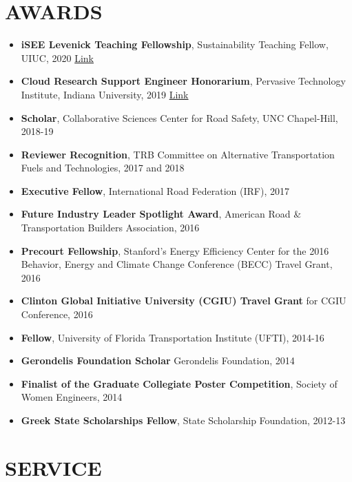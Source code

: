 \documentclass[margin,line]{resume}
\begin{document}
\begin{resume}
	     \section{\mysidestyle \bf AWARDS} 
%
  \vspace{0pt}
    \begin{itemize}
\item \textbf{iSEE Levenick Teaching Fellowship}, Sustainability Teaching Fellow, UIUC, 2020 \href{https://sustainability.illinois.edu/about/partnerships/levenick-isee-fellows-program/}{Link}
\item \textbf{Cloud Research Support Engineer Honorarium}, Pervasive Technology Institute, Indiana University, 2019 \href{https://educationblog.microsoft.com/en-us/2019/02/announcing-a-1m-grant-to-advance-the-role-of-humanware-in-academic-research/}{Link}
\item \textbf{Scholar}, Collaborative Sciences Center for Road Safety, UNC Chapel-Hill, 2018-19
\item \textbf{Reviewer Recognition}, TRB Committee on Alternative Transportation Fuels and Technologies, 2017 and 2018
\item \textbf{Executive Fellow}, International Road Federation (IRF), 2017
\item \textbf{Future Industry Leader Spotlight Award}, American Road & Transportation Builders Association, 2016
\item  \textbf{Precourt Fellowship}, Stanford’s Energy Efficiency Center for the 2016 Behavior, Energy and Climate Change Conference (BECC) Travel Grant, 2016
\item \textbf{Clinton Global Initiative University (CGIU) Travel Grant} for CGIU Conference, 2016
\item \textbf{Fellow}, University of Florida Transportation Institute (UFTI), 2014-16
\item \textbf{Gerondelis Foundation Scholar} Gerondelis Foundation, 2014
\item \textbf{Finalist of the Graduate Collegiate Poster Competition}, Society of Women Engineers, 2014
\item \textbf{Greek State Scholarships Fellow}, State Scholarship Foundation, 2012-13
\end{itemize}    


\section{\mysidestyle \bf SERVICE}
  \vspace{-12pt}

\end{resume}
\end{document}

